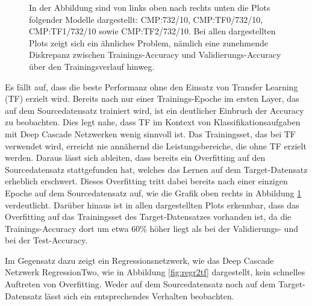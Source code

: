 \begin{figure}[htpb]
    \caption{\label{fig:layertf} 
    \small{In der Abbildung sind von links oben nach rechts unten die Plots folgender Modelle dargestellt: CMP:732/10, CMP:TF0/732/10, 
    CMP:TF1/732/10 sowie CMP:TF2/732/10. Bei allen dargestellten Plots zeigt sich ein ähnliches Problem, nämlich eine zunehmende Diskrepanz 
    zwischen Trainings-Accuracy und Validierungs-Accuracy über den Trainingsverlauf hinweg.}}
\end{figure}

Es fällt auf, dass die beste Performanz ohne den Einsatz von Transfer Learning (TF) erzielt wird. Bereits nach nur einer Trainings-Epoche im 
ersten Layer, das auf dem Sourcedatensatz trainiert wird, ist ein deutlicher Einbruch der Accuracy zu beobachten. Dies legt nahe, dass TF im 
Kontext von Klassifikationsaufgaben mit Deep Cascade Netzwerken wenig sinnvoll ist. Das Trainingsset, das bei TF verwendet wird, erreicht nie 
annähernd die Leistungsbereiche, die ohne TF erzielt werden. Daraus lässt sich ableiten, dass bereits ein Overfitting auf den Sourcedatensatz 
stattgefunden hat, welches das Lernen auf dem Target-Datensatz erheblich erschwert. Dieses Overfitting tritt dabei bereits nach einer einzigen 
Epoche auf dem Sourcedatensatz auf, wie die Grafik oben rechts in Abbildung \ref{fig:layertf} verdeutlicht. Darüber hinaus ist in allen 
dargestellten Plots erkennbar, dass das Overfitting auf das Trainingsset des Target-Datensatzes vorhanden ist, da die Trainings-Accuracy dort 
um etwa 60\% höher liegt als bei der Validierungs- und bei der Test-Accuracy.

Im Gegensatz dazu zeigt ein Regressionsnetzwerk, wie das Deep Cascade Netzwerk RegressionTwo, wie in Abbildung \ref{fig:regr2tf} dargestellt, 
kein schnelles Auftreten von Overfitting. Weder auf dem Sourcedatensatz noch auf dem Target-Datensatz lässt sich ein entsprechendes Verhalten 
beobachten.

